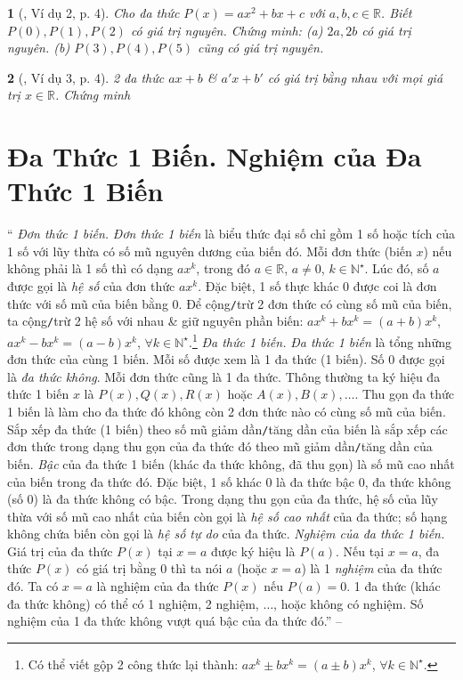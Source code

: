 \documentclass{article}
\newtheorem{baitoan}{}
\begin{document}
\begin{baitoan}[\cite{Binh_Toan_7_tap_2}, Ví dụ 2, p. 4]
	Cho đa thức $P(x) = ax^2 + bx + c$ với $a,b,c\in\mathbb{R}$. Biết $P(0),P(1),P(2)$ có giá trị nguyên. Chứng minh: (a) $2a,2b$ có giá trị nguyên. (b) $P(3),P(4),P(5)$ cũng có giá trị nguyên.
\end{baitoan}

\begin{baitoan}[\cite{Binh_Toan_7_tap_2}, Ví dụ 3, p. 4]
	2 đa thức $ax + b$ \& $a'x + b'$ có giá trị bằng nhau với mọi giá trị $x\in\mathbb{R}$. Chứng minh 
\end{baitoan}


\section{Đa Thức 1 Biến. Nghiệm của Đa Thức 1 Biến}
`` \textit{Đơn thức 1 biến.} \textit{Đơn thức 1 biến} là biểu thức đại số chỉ gồm 1 số hoặc tích của 1 số với lũy thừa có số mũ nguyên dương của biến đó. Mỗi đơn thức (biến $x$) nếu không phải là 1 số thì có dạng $ax^k$, trong đó $a\in\mathbb{R}$, $a\ne0$, $k\in\mathbb{N}^\star$. Lúc đó, số $a$ được gọi là \textit{hệ số} của đơn thức $ax^k$. Đặc biệt, 1 số thực khác $0$ được coi là đơn thức với số mũ của biến bằng $0$. Để cộng\texttt{/}trừ 2 đơn thức có cùng số mũ của biến, ta cộng\texttt{/}trừ 2 hệ số với nhau \& giữ nguyên phần biến: $ax^k + bx^k = (a + b)x^k$, $ax^k - bx^k = (a - b)x^k$, $\forall k\in\mathbb{N}^\star$.\footnote{Có thể viết gộp 2 công thức lại thành: $ax^k\pm bx^k = (a\pm b)x^k$, $\forall k\in\mathbb{N}^\star$.}  \textit{Đa thức 1 biến.} \textit{Đa thức 1 biến} là tổng những đơn thức của cùng 1 biến. Mỗi số được xem là 1 đa thức (1 biến). Số $0$ được gọi là \textit{đa thức không}. Mỗi đơn thức cũng là 1 đa thức. Thông thường ta ký hiệu đa thức 1 biến $x$ là $P(x),Q(x),R(x)$ hoặc $A(x),B(x),\ldots$. Thu gọn đa thức 1 biến là làm cho đa thức đó không còn 2 đơn thức nào có cùng số mũ của biến. Sắp xếp đa thức (1 biến) theo số mũ giảm dần\texttt{/}tăng dần của biến là sắp xếp các đơn thức trong dạng thu gọn của đa thức đó theo mũ giảm dần\texttt{/}tăng dần của biến. \textit{Bậc} của đa thức 1 biến (khác đa thức không, đã thu gọn) là số mũ cao nhất của biến trong đa thức đó. Đặc biệt, 1 số khác 0 là đa thức bậc 0, đa thức không (số 0) là đa thức không có bậc. Trong dạng thu gọn của đa thức, hệ số của lũy thừa với số mũ cao nhất của biến còn gọi là \textit{hệ số cao nhất} của đa thức; số hạng không chứa biến còn gọi là \textit{hệ số tự do} của đa thức.  \textit{Nghiệm của đa thức 1 biến.} Giá trị của đa thức $P(x)$ tại $x = a$ được ký hiệu là $P(a)$. Nếu tại $x = a$, đa thức $P(x)$ có giá trị bằng $0$ thì ta nói $a$ (hoặc $x = a$) là 1 \textit{nghiệm} của đa thức đó. Ta có $x = a$ là nghiệm của đa thức $P(x)$ nếu $P(a) = 0$. 1 đa thức (khác đa thức không) có thể có 1 nghiệm, 2 nghiệm, $\ldots$, hoặc không có nghiệm. Số nghiệm của 1 đa thức không vượt quá bậc của đa thức đó.'' -- \cite[Chap. VI, \S2, pp. 40--41]{SBT_Toan_7_Canh_Dieu_tap_2}
\end{document}
